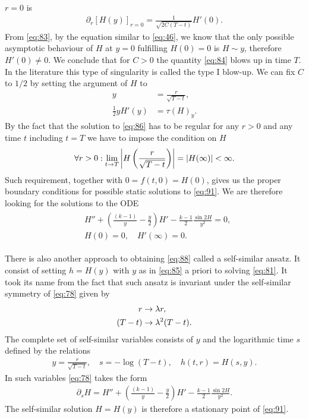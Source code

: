 $r=0$ is
\begin{align}
  \label{eq:84}
  \partial_r\left[ H(y)\right]_{r=0} =\frac{1}{\sqrt{2C(T-t)}}H'(0).
\end{align}
From \eqref{eq:83}, by the equation similar to \eqref{eq:46}, we know
that the only possible asymptotic behaviour of $H$ at $y=0$ fulfilling
$H(0)=0$ is $H\sim y$, therefore $H'(0)\ne0$. We conclude that for
$C>0$ the quantity \eqref{eq:84} blows up in time $T$. In the
literature this type of singularity is called the type I blow-up.
We can fix $C$ to $1/2$ by setting the argument of $H$ to
\begin{align}
  \label{eq:85}
  y&=\frac{r}{\sqrt{T-t}},\\
  \label{eq:86}
  \frac{1}{2}yH'(y)&=\tau(H)_y.
\end{align}
By the fact that the solution to \eqref{eq:86} has to be regular for
any $r>0$ and any time $t$ including $t=T$ we have to impose the
condition on $H$
\begin{align}
  \label{eq:87}
  \forall{r>0}:\lim_{t\rightarrow T}
  \left|H\left(\frac{r}{\sqrt{T-t}}\right)\right|=\left|H(\infty)\right|<\infty.
\end{align}
Such requirement, together with $0=f(t,0)=H(0)$, gives us the proper
boundary conditions for possible static solutions to \eqref{eq:91}. We
are therefore looking for the solutions to the ODE
\begin{align}
  \label{eq:88}
  \begin{split}
    &H''+\left(\frac{(k-1)}{y}-\frac{y}{2}\right)H'-\frac{k-1}{2}\frac{\sin2H}{y^2}=0,\\
    &H(0)=0,\quad H'(\infty)=0.
  \end{split}
\end{align}

There is also another approach to obtaining \eqref{eq:88} called a
self-similar ansatz. It consist of setting $h=H(y)$ with $y$ as in
\eqref{eq:85} a priori to solving \eqref{eq:81}. It took its name from
the fact that such ansatz is invariant under the self-similar symmetry
of \eqref{eq:78} given by
\begin{align}
  \label{eq:89}
  r&\rightarrow\lambda r,\\(T-t)&\rightarrow\lambda^2(T-t).
\end{align}
The complete set of self-similar variables consists of $y$ and the
logarithmic time $s$ defined by the relations
\begin{align}
  \label{eq:90}
  y=\frac{r}{\sqrt{T-t}},\quad s=-\log(T-t),\quad h(t,r)=H(s,y).
\end{align}
In such variables \eqref{eq:78} takes the form
\begin{align}
  \label{eq:91}
  \partial_s
  H=H''+\left(\frac{(k-1)}{y}-\frac{y}{2}\right)H'-\frac{k-1}{2}\frac{\sin2H}{y^2}.
\end{align}
The self-similar solution $H=H(y)$ is therefore a stationary point of
\eqref{eq:91}.\\

